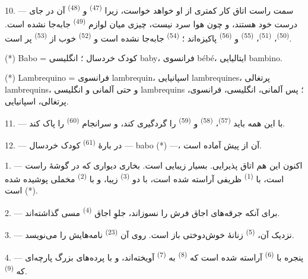 10. --- سمت راست اتاق کار کمتری از او خواهد خواست، زیرا  \textsuperscript{(47)} و  \textsuperscript{(48)}
آن در جای درست خود هستند، و چون هوا سرد نیست، چیزی میان لوازم
 \textsuperscript{(49)} جابه‌جا نشده است.
 \textsuperscript{(50)}، 
\textsuperscript{(51)}،  \textsuperscript{(55)} و
 \textsuperscript{(56)} پاکیزه‌اند ؛  \textsuperscript{(54)} جابه‌جا نشده است و 
\textsuperscript{(52)} خوب از  \textsuperscript{(53)} پر
است.

(*) Babo = کودک خردسال ؛ انگلیسی baby، فرانسوی bébé، ایتالیایی bambino.

(*) Lambrequino = فرانسوی lambrequin، اسپانیایی lambrequines، پرتغالی
lambrequins، و حتی آلمانی و انگلیسی lambrequins ؛ پس آلمانی، انگلیسی،
فرانسوی، پرتغالی، اسپانیایی.

11. --- با این همه باید  \textsuperscript{(57)}،
 \textsuperscript{(58)} و  \textsuperscript{(59)} را گردگیری کند، و سرانجام
 \textsuperscript{(60)} را پاک کند.

12. --- در بارهٔ  \textsuperscript{(61)} کودک خردسال —
babo (*) —، آن از پیش آماده است.

\VUsaut{5.0mm}
\VUsaut{3.0mm}

1. --- اکنون این هم اتاق پذیرایی.  بسیار زیبایی است. بخاری
دیواری که در گوشهٔ راست است، با 
\textsuperscript{(1)} ظریفی آراسته شده است، با دو 
\textsuperscript{(3)} زیبا، و با  \textsuperscript{(2)}
مخملی پوشیده شده است (*).

2. --- برای آنکه جرقه‌های اجاق فرش را نسوزاند، جلوِ اجاق  \textsuperscript{(4)} مسی گذاشته‌اند.

3. --- نزدیک آن،  \textsuperscript{(5)} زنانهٔ
خوش‌دوختی باز است. روی آن  \textsuperscript{(23)}
نامه‌هایش را می‌نویسد.

4. --- پنجره با  \textsuperscript{(6)} آراسته شده
است که  \textsuperscript{(8)} به 
\textsuperscript{(7)} آویخته‌اند، و با پرده‌های بزرگ پارچه‌ای که
 \textsuperscript{(9)}.

